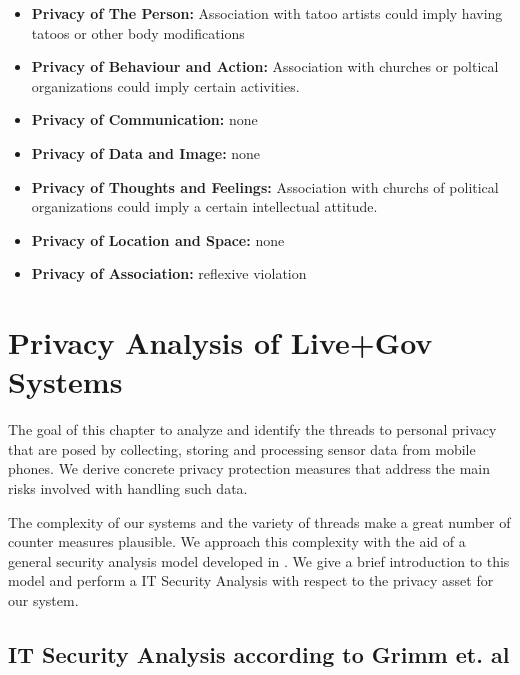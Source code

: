 \begin{itemize}

\item
  \textbf{Privacy of The Person:} Association with tatoo artists could
  imply having tatoos or other body modifications
\item
  \textbf{Privacy of Behaviour and Action:} Association with churches or
  poltical organizations could imply certain activities.
\item
  \textbf{Privacy of Communication:} none
\item
  \textbf{Privacy of Data and Image:} none
\item
  \textbf{Privacy of Thoughts and Feelings:} Association with churchs of
  political organizations could imply a certain intellectual attitude.
\item
  \textbf{Privacy of Location and Space:} none
\item
  \textbf{Privacy of Association:} reflexive violation
\end{itemize}




\pagebreak

\chapter{Privacy Analysis of Live+Gov Systems}

The goal of this chapter to analyze and identify the threads to personal privacy that are posed by collecting, storing and processing sensor data from mobile phones.
We derive concrete privacy protection measures that address the main risks involved with handling such data.

The complexity of our systems and the variety of threads make a great number of counter measures plausible.
We approach this complexity with the aid of a general security analysis model developed in \cite{Grimm}.
We give a brief introduction to this model and perform a IT Security Analysis with respect to the privacy asset for our system.

\section{IT Security Analysis according to Grimm et. al}

